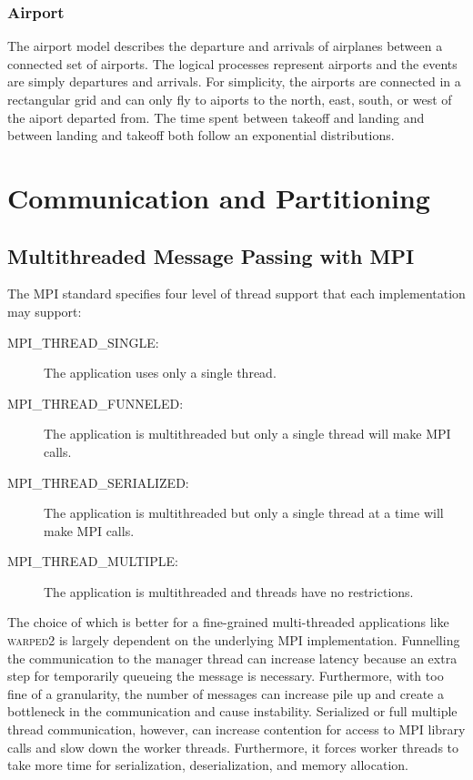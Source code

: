 \documentclass[11pt]{book}
\begin{document}
\subsection{Airport}

The airport model describes the departure and arrivals of airplanes between a connected
set of airports. The logical processes represent airports and the events are simply
departures and arrivals. For simplicity, the airports are connected in a rectangular grid
and can only fly to aiports to the north, east, south, or west of the aiport departed from.
The time spent between takeoff and landing and between landing and takeoff both follow an
exponential distributions.



\chapter{Communication and Partitioning} \label{partitioning_communication}

\section{Multithreaded Message Passing with MPI}

The MPI standard specifies four level of thread support that each implementation may support:

\begin{description}
    \item[MPI\_THREAD\_SINGLE:] The application uses only a single thread.
    \item[MPI\_THREAD\_FUNNELED:] The application is multithreaded but only a single thread will
        make MPI calls.
    \item[MPI\_THREAD\_SERIALIZED:] The application is multithreaded but only a single thread at
        a time will make MPI calls.
    \item[MPI\_THREAD\_MULTIPLE:] The application is multithreaded and threads have no restrictions.
\end{description}

The choice of which is better for a fine-grained multi-threaded applications like \textsc{warped2}
is largely dependent on the underlying MPI implementation. Funnelling the communication to the
manager thread can increase latency because an extra step for temporarily queueing the message
is necessary. Furthermore, with too fine of a granularity, the number of messages can increase
pile up and create a bottleneck in the communication and cause instability. Serialized or full
multiple thread communication, however, can increase contention for access to MPI library calls
and slow down the worker threads. Furthermore, it forces worker threads to take more time for
serialization, deserialization, and memory allocation.
\end{document}
